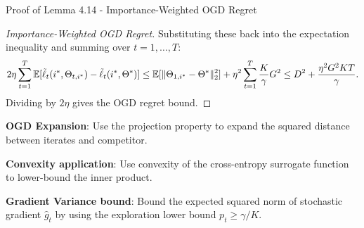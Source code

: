\begin{sourceblock}{Proof of Lemma 4.14 - Importance-Weighted OGD Regret}
\begin{proof}[Importance-Weighted OGD Regret]
Substituting these back into the expectation inequality and summing over $t = 1, \dots, T$:
\begin{equation}
    2\eta \sum_{t=1}^T \mathbb{E}[\tilde{\ell}_t(i^*, \Theta_{t, i^*}) - \tilde{\ell}_t(i^*, \Theta^*)] \le \mathbb{E}[\|\Theta_{1, i^*} - \Theta^*\|_2^2] + \eta^2 \sum_{t=1}^T \frac{K}{\gamma} G^2 \le D^2 + \frac{\eta^2 G^2 K T}{\gamma}.
\end{equation}
Dividing by $2\eta$ gives the OGD regret bound.
\end{proof}
\end{sourceblock}

\begin{guideblock}
\item \textbf{OGD Expansion}: Use the projection property to expand the squared distance between iterates and competitor.
\item \textbf{Convexity application}: Use convexity of the cross-entropy surrogate function to lower-bound the inner product.
\item \textbf{Gradient Variance bound}: Bound the expected squared norm of stochastic gradient $\hat{g}_t$ by using the exploration lower bound $p_{t} \ge \gamma/K$.
\end{guideblock}


